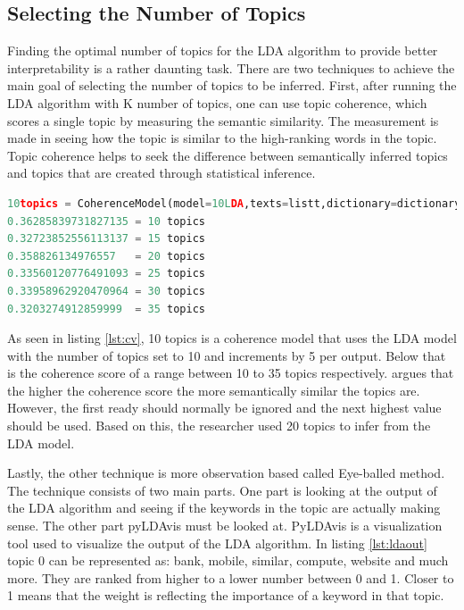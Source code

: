 \subsection{Selecting the Number of Topics} \label{ssc:lekker}

Finding the optimal number of topics for the LDA algorithm to provide better interpretability is a rather daunting task. There are two techniques to achieve the main goal of selecting the number of topics to be inferred. First, after running the LDA algorithm with K number of topics, one can use topic coherence, which scores a single topic by measuring the semantic similarity. The measurement is made in seeing how the topic is similar to the high-ranking words in the topic. Topic coherence helps to seek the difference between semantically inferred topics and topics that are created through statistical inference.

\begin{lstlisting}[language=Python, label={lst:cv}, caption=Topic coherence]
10topics = CoherenceModel(model=10LDA,texts=listt,dictionary=dictionary,coherence='c_v')
0.36285839731827135 = 10 topics
0.32723852556113137 = 15 topics
0.358826134976557   = 20 topics
0.33560120776491093 = 25 topics
0.33958962920470964 = 30 topics
0.3203274912859999  = 35 topics
\end{lstlisting}
As seen in listing \ref{lst:cv}, 10 topics is a coherence model that uses the LDA model with the number of topics set to 10 and increments by 5 per output. Below that is the coherence score of a range between 10 to 35 topics respectively. \cite{stevens-etal-2012-exploring} argues that the higher the coherence score the more semantically similar the topics are. However, the first ready should normally be ignored and the next highest value should be used. Based on this, the researcher used 20 topics to infer from the LDA model.

Lastly, the other technique is more observation based called Eye-balled method. The technique consists of two main parts. One part is looking at the output of the LDA algorithm and seeing if the keywords in the topic are actually making sense. The other part pyLDAvis must be looked at. PyLDAvis is a visualization tool used to visualize the output of the LDA algorithm. 
In listing \ref{lst:ldaout} topic 0 can be represented as: bank, mobile, similar, compute, website and much more. They are ranked from higher to a lower number between 0 and 1. Closer to 1 means that the weight is reflecting the importance of a keyword in that topic.



